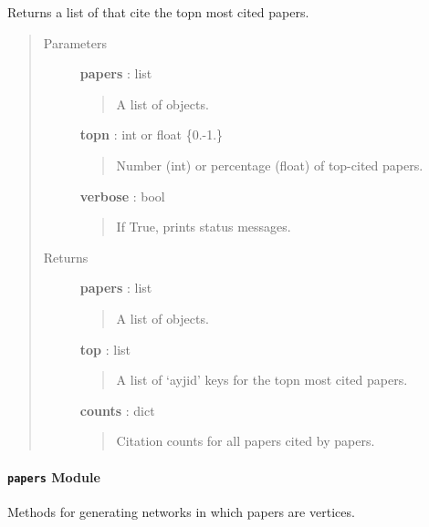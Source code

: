 \documentclass[letterpaper,10pt,english]{sphinxmanual}
\begin{document}
\begin{fulllineitems}
\label{tethne.networks:tethne.networks.helpers.top_parents}
Returns a list of {\hyperref[tethne:tethne.data.Paper]{}} that cite the topn most cited papers.
\begin{quote}\begin{description}
\item[{Parameters }] \leavevmode
\textbf{papers} : list
\begin{quote}

A list of {\hyperref[tethne:tethne.data.Paper]{}} objects.
\end{quote}

\textbf{topn} : int or float \{0.-1.\}
\begin{quote}

Number (int) or percentage (float) of top-cited papers.
\end{quote}

\textbf{verbose} : bool
\begin{quote}

If True, prints status messages.
\end{quote}

\item[{Returns }] \leavevmode
\textbf{papers} : list
\begin{quote}

A list of {\hyperref[tethne:tethne.data.Paper]{}} objects.
\end{quote}

\textbf{top} : list
\begin{quote}

A list of `ayjid' keys for the topn most cited papers.
\end{quote}

\textbf{counts} : dict
\begin{quote}

Citation counts for all papers cited by papers.
\end{quote}

\end{description}\end{quote}

\end{fulllineitems}



\paragraph{\texttt{papers} Module}
\label{tethne.networks:module-tethne.networks.papers}\label{tethne.networks:papers-module}
Methods for generating networks in which papers are vertices.
\end{document}
